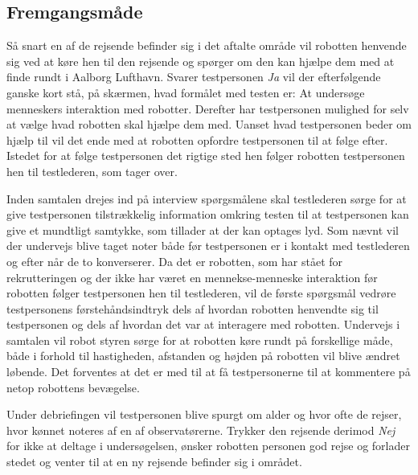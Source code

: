 \subsection*{Fremgangsmåde}
\label{Fremgangsmaade}
%
Så snart en af de rejsende befinder sig i det aftalte område vil robotten henvende sig ved at køre hen til den rejsende og spørger om den kan hjælpe dem med at finde rundt i Aalborg Lufthavn. Svarer testpersonen \textit{Ja} vil der efterfølgende ganske kort stå, på skærmen, hvad formålet med testen er: At undersøge menneskers interaktion med robotter. Derefter har testpersonen mulighed for selv at vælge hvad robotten skal hjælpe dem med. Uanset hvad testpersonen beder om hjælp til vil det ende med at robotten opfordre testpersonen til at følge efter. Istedet for at følge testpersonen det rigtige sted hen følger robotten testpersonen hen til testlederen, som tager over. 

Inden samtalen drejes ind på interview spørgsmålene skal testlederen sørge for at give testpersonen tilstrækkelig information omkring testen til at testpersonen kan give et mundtligt samtykke, som tillader at der kan optages lyd. Som nævnt vil der undervejs blive taget noter både før testpersonen er i kontakt med testlederen og efter når de to konverserer. \blankline
%
Da det er robotten, som har stået for rekrutteringen og der ikke har været en mennekse-menneske interaktion før robotten følger testpersonen hen til testlederen, vil de første spørgsmål vedrøre testpersonens førstehåndsindtryk dels af hvordan robotten henvendte sig til testpersonen og dels af hvordan det var at interagere med robotten. Undervejs i samtalen vil robot styren sørge for at robotten køre rundt på forskellige måde, både i forhold til hastigheden, afstanden og højden på robotten vil blive ændret løbende. Det forventes at det er med til at få testpersonerne til at kommentere på netop robottens bevægelse. 

Under debriefingen vil testpersonen blive spurgt om alder og hvor ofte de rejser, hvor kønnet noteres af en af observatørerne.\blankline      
%
Trykker den rejsende derimod \textit{Nej} for ikke at deltage i undersøgelsen, ønsker robotten personen god rejse og forlader stedet og venter til at en ny rejsende befinder sig i området.



     
